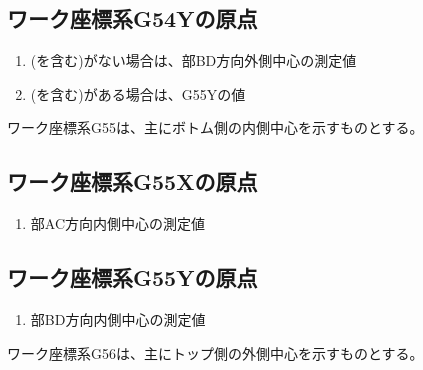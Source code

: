\subsection{ワーク座標系{\ttfamily G54Y}の原点}
\begin{enumerate}[label*=\sarrow]
\item \BottomOutcut(\BottomCurvedOutcut を含む)がない場合は、\BottomEndFace 部BD方向外側中心の測定値
\item \BottomOutcut(\BottomCurvedOutcut を含む)がある場合は、{\ttfamily G55Y}の値
\end{enumerate}



\clearpage
ワーク座標系{\ttfamily G55}は、主にボトム側の内側中心を示すものとする。


\subsection{ワーク座標系{\ttfamily G55X}の原点}
\begin{enumerate}[label*=\sarrow]
\item \BottomEndFace 部AC方向内側中心の測定値
\end{enumerate}


\subsection{ワーク座標系{\ttfamily G55Y}の原点}
\begin{enumerate}[label*=\sarrow]
\item \BottomEndFace 部BD方向内側中心の測定値
\end{enumerate}



ワーク座標系{\ttfamily G56}は、主にトップ側の外側中心を示すものとする。


